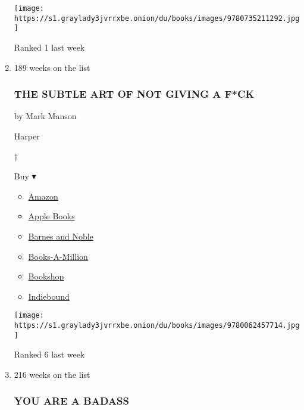 \begin{enumerate}
  \texttt{[image: https://s1.graylady3jvrrxbe.onion/du/books/images/9780735211292.jpg]}

  Ranked 1 last week
\item
  189 weeks on the list

  \hypertarget{the-subtle-art-of-not-giving-a-fck}{%
  \subsubsection{THE SUBTLE ART OF NOT GIVING A
  F*CK}\label{the-subtle-art-of-not-giving-a-fck}}

  by Mark Manson

  Harper

  †

  Buy ▾

  \begin{itemize}
  \tightlist
  \item
    \href{http://www.amazon.com/Subtle-Art-Not-Giving-Counterintuitive/dp/0062457713?tag=NYTBS-20}{Amazon}
  \item
    \href{https://du-gae-books-dot-nyt-du-prd.appspot.com/buy?title=THE+SUBTLE+ART+OF+NOT+GIVING+A+F\%2ACK\&author=Mark+Manson}{Apple
    Books}
  \item
    \href{https://www.anrdoezrs.net/click-7990613-11819508?url=https\%3A\%2F\%2Fwww.barnesandnoble.com\%2Fw\%2F\%3Fean\%3D9780062457714}{Barnes
    and Noble}
  \item
    \href{https://www.anrdoezrs.net/click-7990613-35140?url=https\%3A\%2F\%2Fwww.booksamillion.com\%2Fp\%2FTHE\%2BSUBTLE\%2BART\%2BOF\%2BNOT\%2BGIVING\%2BA\%2BF\%252ACK\%2FMark\%2BManson\%2F9780062457714}{Books-A-Million}
  \item
    \href{https://bookshop.org/a/3546/9780062457714}{Bookshop}
  \item
    \href{https://www.indiebound.org/book/9780062457714?aff=NYT}{Indiebound}
  \end{itemize}

  \texttt{[image: https://s1.graylady3jvrrxbe.onion/du/books/images/9780062457714.jpg]}

  Ranked 6 last week
\item
  216 weeks on the list

  \hypertarget{you-are-a-badass}{%
  \subsubsection{YOU ARE A BADASS}\label{you-are-a-badass}}


\end{enumerate}
